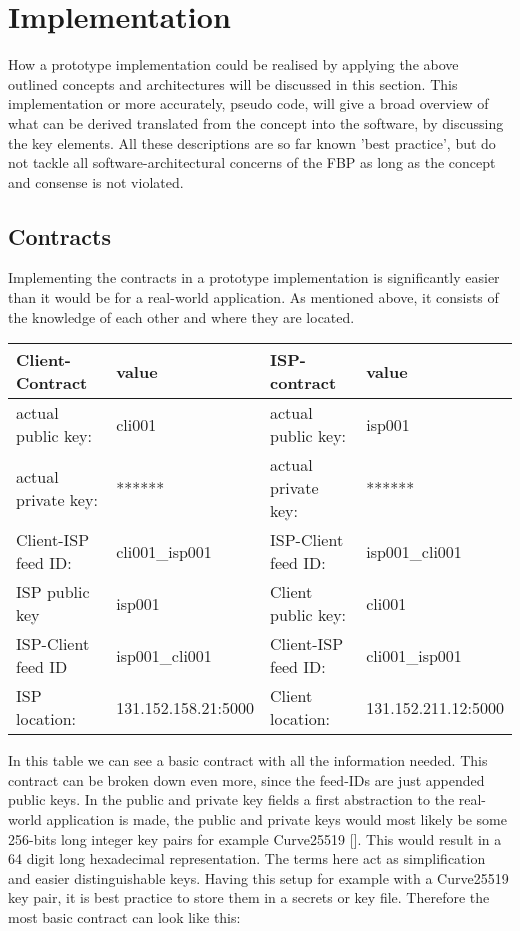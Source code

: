 \chapter{Implementation}
How a prototype implementation could be realised by applying the above outlined concepts and architectures will be discussed in this section. This implementation or more accurately, pseudo code, will give a broad overview of what can be derived translated from the concept into the software, by discussing the key elements. All these descriptions are so far known 'best practice', but do not tackle all software-architectural concerns of the FBP as long as the concept and consense is not violated.
\section{Contracts}
Implementing the contracts in a prototype implementation is significantly easier than it would be for a real-world application. As mentioned above, it consists of the knowledge of each other and where they are located.
\begin{center}
    \begin{tabular}{llll} \toprule
        Client-Contract&value&ISP-contract&value\\ \midrule
        actual public key:& cli001 &  actual public key: &isp001  \\ 
        actual private key:& ****** & actual private key:& ****** \\
        Client-ISP feed ID:& cli001\_isp001 &ISP-Client feed ID:&isp001\_cli001 \\ 
        ISP public key&isp001&Client public key:&cli001\\
        ISP-Client feed ID&isp001\_cli001&Client-ISP feed ID:&cli001\_isp001\\
        ISP location:&131.152.158.21:5000 &Client location:& 131.152.211.12:5000 \\\bottomrule
    \end{tabular}
\end{center}

In this table we can see a basic contract with all the information needed. This contract can be broken down even more, since the feed-IDs are just appended public keys. In the public and private key fields a first abstraction to the real-world application is made, the public and private keys would most likely be some 256-bits long integer key pairs for example Curve25519 []. This would result in a 64 digit long hexadecimal representation. The terms here act as simplification and easier distinguishable keys. Having this setup for example with a Curve25519 key pair, it is best practice to store them in a secrets or key file. Therefore the most basic contract can look like this:

